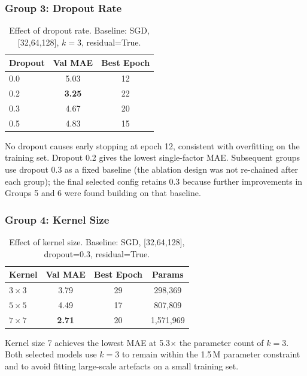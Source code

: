 \documentclass[11pt,a4paper]{article}
\begin{document}
\subsubsection{Group 3: Dropout Rate}

\begin{table}[h]
\centering
\caption{Effect of dropout rate. Baseline: SGD, [32,64,128], $k=3$, residual=True.}
\begin{tabular}{lcc}
\toprule
Dropout & Val MAE & Best Epoch \\
\midrule
0.0 & 5.03 & 12 \\
0.2 & \textbf{3.25} & 22 \\
0.3 & 4.67 & 20 \\
0.5 & 4.83 & 15 \\
\bottomrule
\end{tabular}
\end{table}

No dropout causes early stopping at epoch 12, consistent with overfitting on the training
set. Dropout 0.2 gives the lowest single-factor MAE. Subsequent groups use dropout 0.3
as a fixed baseline (the ablation design was not re-chained after each group); the final
selected config retains 0.3 because further improvements in Groups 5 and 6 were found
building on that baseline.

\subsubsection{Group 4: Kernel Size}

\begin{table}[h]
\centering
\caption{Effect of kernel size. Baseline: SGD, [32,64,128], dropout=0.3, residual=True.}
\begin{tabular}{lccc}
\toprule
Kernel & Val MAE & Best Epoch & Params \\
\midrule
$3\times3$ & 3.79 & 29 &    298,369 \\
$5\times5$ & 4.49 & 17 &    807,809 \\
$7\times7$ & \textbf{2.71} & 20 & 1,571,969 \\
\bottomrule
\end{tabular}
\end{table}

Kernel size 7 achieves the lowest MAE at 5.3$\times$ the parameter count of $k=3$.
Both selected models use $k=3$ to remain within the 1.5\,M parameter constraint and to
avoid fitting large-scale artefacts on a small training set.
\end{document}
